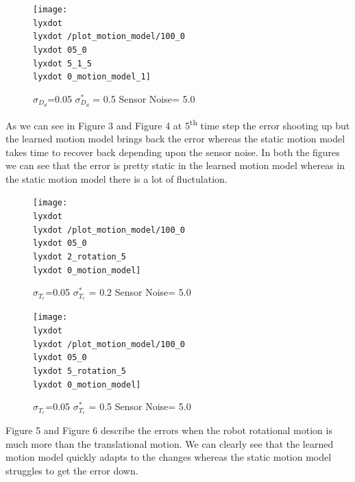\documentclass[12pt]{dalcsthesis}
\begin{document}
{\begin{figure}
\end{figure}


\begin{figure}
\caption{$\sigma_{D_{d}}$=0.05 $\sigma_{D_{d}}^{*}$ = 0.5 Sensor Noise= 5.0}


\texttt{[image: \\lyxdot \\lyxdot /plot\_motion\_model/100\_0\\lyxdot 05\_0\\lyxdot 5\_1\_5\\lyxdot 0\_motion\_model\_1]}

\end{figure}


As we can see in Figure 3 and Figure 4 at 5\textsuperscript{th} time
step the error shooting up but the learned motion model brings back
the error whereas the static motion model takes time to recover back
depending upon the sensor noise. In both the figures we can see that
the error is pretty static in the learned motion model whereas in
the static motion model there is a lot of fluctulation. 

\begin{figure}
\caption{$\sigma_{T_{r}}$=0.05 $\sigma_{T_{r}}^{*}$ = 0.2 Sensor Noise= 5.0}


\texttt{[image: \\lyxdot \\lyxdot /plot\_motion\_model/100\_0\\lyxdot 05\_0\\lyxdot 2\_rotation\_5\\lyxdot 0\_motion\_model]}

\end{figure}


\begin{figure}
\caption{$\sigma_{T_{r}}$=0.05 $\sigma_{T_{r}}^{*}$ = 0.5 Sensor Noise= 5.0}


\texttt{[image: \\lyxdot \\lyxdot /plot\_motion\_model/100\_0\\lyxdot 05\_0\\lyxdot 5\_rotation\_5\\lyxdot 0\_motion\_model]}

\end{figure}


Figure 5 and Figure 6 describe the errors when the robot rotational
motion is much more than the translational motion. We can clearly
see that the learned motion model quickly adapts to the changes whereas
the static motion model struggles to get the error down. 

}
\end{document}
